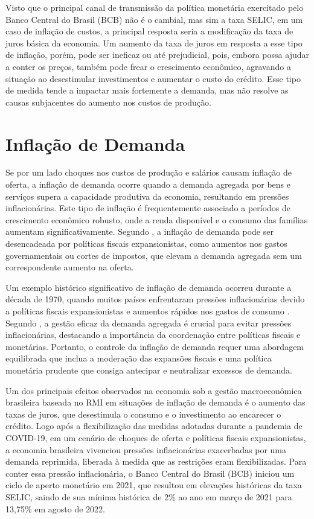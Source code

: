 \documentclass[12pt,oneside,a4paper,chapter=TITLE,english,brazil,sumario=abnt-6027-2012]{abntex2}
\begin{document}
Visto que o principal canal de transmissão da política monetária exercitado pelo Banco Central do Brasil (BCB) não é o cambial, mas sim a taxa SELIC, em um caso de inflação de custos, a principal resposta seria a modificação da taxa de juros básica da economia. Um aumento da taxa de juros em resposta a esse tipo de inflação, porém, pode ser ineficaz ou até prejudicial, pois, embora possa ajudar a conter os preços, também pode frear o crescimento econômico, agravando a situação ao desestimular investimentos e aumentar o custo do crédito. Esse tipo de medida tende a impactar mais fortemente a demanda, mas não resolve as causas subjacentes do aumento nos custos de produção.

\section{Inflação de Demanda}

Se por um lado choques nos custos de produção e salários causam inflação de oferta, a inflação de demanda ocorre quando a demanda agregada por bens e serviços supera a capacidade produtiva da economia, resultando em pressões inflacionárias. Este tipo de inflação é frequentemente associado a períodos de crescimento econômico robusto, onde a renda disponível e o consumo das famílias aumentam significativamente. Segundo , a inflação de demanda pode ser desencadeada por políticas fiscais expansionistas, como aumentos nos gastos governamentais ou cortes de impostos, que elevam a demanda agregada sem um correspondente aumento na oferta.

Um exemplo histórico significativo de inflação de demanda ocorreu durante a década de 1970, quando muitos países enfrentaram pressões inflacionárias devido a políticas fiscais expansionistas e aumentos rápidos nos gastos de consumo \cite{blinder_2008_the}. Segundo \cite{woodford_2009_interest}, a gestão eficaz da demanda agregada é crucial para evitar pressões inflacionárias, destacando a importância da coordenação entre políticas fiscais e monetárias. Portanto, o controle da inflação de demanda requer uma abordagem equilibrada que inclua a moderação das expansões fiscais e uma política monetária prudente que consiga antecipar e neutralizar excessos de demanda.

Um dos principais efeitos observados na economia sob a gestão macroeconômica brasileira baseada no RMI em situações de inflação de demanda é o aumento das taxas de juros, que desestimula o consumo e o investimento ao encarecer o crédito. Logo após a flexibilização das medidas adotadas durante a pandemia de COVID-19, em um cenário de choques de oferta e políticas fiscais expansionistas, a economia brasileira vivenciou pressões inflacionárias exacerbadas por uma demanda reprimida, liberada à medida que as restrições eram flexibilizadas. Para conter essa pressão inflacionária, o Banco Central do Brasil (BCB) iniciou um ciclo de aperto monetário em 2021, que resultou em elevações históricas da taxa SELIC, saindo de sua mínima histórica de 2\% ao ano em março de 2021 para 13,75\% em agosto de 2022.
\end{document}
